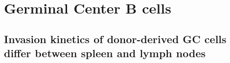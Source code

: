\documentclass[11pt]{article}
\newcommand{\ie}{\textit{i.e.}}
\newcommand{\khi}{Ki67$^\text{hi}$}
\newcommand{\klo}{Ki67$^\text{lo}$}
\begin{document}
	
	\vspace{1cm}
	
	
	
	\clearpage
	
	\section*{Germinal Center B cells}
	
	\subsection*{Invasion kinetics of donor-derived GC cells differ between spleen and lymph nodes}
	
\end{document}
